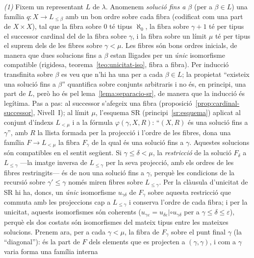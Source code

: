 \begin{prova}
\emph{(1)} Fixem un representant \(L\) de \(\lambda\). Anomenem \emph{solució
fins a \(\beta\)} (per a \(\beta\in L\)) una família \(q\colon X\to L_{\le\beta}\)
amb un bon ordre sobre cada fibra (codificat com una part de \(X\times X\)),
tal que la fibra sobre \(0\) té tipus \(\aleph_0\), la fibra sobre
\(\gamma+1\) té per tipus el successor cardinal del de la fibra sobre
\(\gamma\), i la fibra sobre un límit \(\mu\) té per tipus el suprem dels de
les fibres sobre \(\gamma<\mu\). Les fibres són bons ordres inicials, de
manera que dues solucions fins a \(\beta\) estan lligades per un \emph{únic}
isomorfisme compatible (rigidesa, teorema~\ref{teo:unicitat-iso}, fibra a
fibra). Per inducció transfinita sobre \(\beta\) es veu que n'hi ha una per
a cada \(\beta\in L\); la propietat \enquote{existeix una solució fins a
\(\beta\)} quantifica sobre conjunts arbitraris i no és, en principi, una part
de \(L\), però ho és pel lema~\ref{lema:separacio-sr}, de manera que la
inducció és legítima. Pas a pas: al successor s'afegeix una fibra
(proposició~\ref{prop:cardinal-successor}, Nivell~I); al límit \(\mu\),
l'esquema SR (principi~\ref{sr:esquema}) aplicat al conjunt d'índexs
\(L_{<\mu}\) i a la fórmula \(\varphi(\gamma,X,R)\): \enquote{\((X,R)\) és
una solució fins a \(\gamma\)}, amb \(R\) la llista formada per la
projecció i l'ordre de les fibres, dona una família \(F\to L_{<\mu}\) la fibra \(F_\gamma\) de la qual és una
solució fins a \(\gamma\). Aquestes solucions són compatibles en el sentit
següent. Si \(\gamma\le\delta<\mu\), la \emph{restricció} de la solució
\(F_\delta\) a \(L_{\le\gamma}\) ---la imatge inversa de \(L_{\le\gamma}\) per
la seva projecció, amb els ordres de les fibres restringits--- és de nou una
solució fins a \(\gamma\), perquè les condicions de la recursió sobre
\(\gamma'\le\gamma\) només miren fibres sobre \(L_{\le\gamma}\). Per la
clàusula d'unicitat de SR hi ha, doncs, un \emph{únic} isomorfisme
\(u_{\gamma\delta}\) de \(F_\gamma\) sobre aquesta restricció que commuta amb
les projeccions cap a \(L_{\le\gamma}\) i conserva l'ordre de cada fibra; i
per la unicitat, aquests isomorfismes són coherents
(\(u_{\gamma\varepsilon}=u_{\delta\varepsilon}|\circ u_{\gamma\delta}\) per
a \(\gamma\le\delta\le\varepsilon\)), perquè els dos costats són isomorfismes
del mateix tipus entre les mateixes solucions. Prenem ara, per a cada
\(\gamma<\mu\), la fibra de \(F_\gamma\) sobre el punt final \(\gamma\)
(la \enquote{diagonal}): és la part de \(F\) dels elements que es projecten
a \((\gamma,\gamma)\), i com a \(\gamma\) varia forma una família interna

\end{prova}
